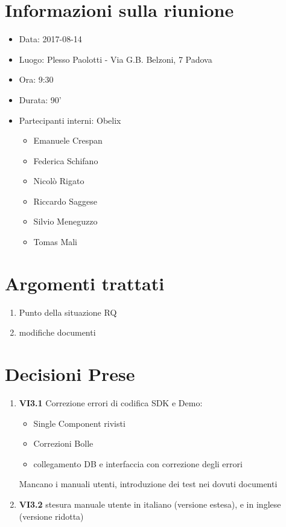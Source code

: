 \documentclass[10 pt,a4paper, openany]{article}
\date{}
\begin{document}
\paginatitolo
\section{Informazioni sulla riunione}

\begin{itemize}
\item[] Data: 2017-08-14
\item[] Luogo: Plesso Paolotti - Via G.B. Belzoni, 7 Padova 
\item[] Ora: 9:30
\item[] Durata: 90'
\item[] Partecipanti interni: Obelix
  \begin{itemize}
  \item[] Emanuele Crespan
  \item[] Federica Schifano
  \item[] Nicolò Rigato
  \item[] Riccardo Saggese
  \item[] Silvio Meneguzzo
  \item[] Tomas Mali
 \end{itemize}
\end{itemize}

\section{Argomenti trattati}
\begin{enumerate}
	\item Punto della situazione RQ
	\item modifiche documenti 


	
\end{enumerate}


\section{Decisioni Prese}
\begin{enumerate}
	\item \textbf{VI3.1} Correzione errori di codifica SDK e Demo:
	\begin{itemize}
		\item Single Component rivisti
		\item Correzioni Bolle 
		\item collegamento DB e interfaccia con correzione degli errori
	\end{itemize}
	Mancano i manuali utenti, introduzione dei test nei dovuti documenti
	
	\item \textbf{VI3.2} stesura manuale utente in italiano (versione estesa), e in inglese (versione ridotta)
	
		
	
\end{enumerate}
\end{document}

